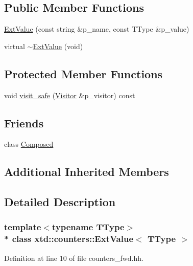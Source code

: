 \subsection*{Public Member Functions}
\begin{DoxyCompactItemize}
\item 
\hyperlink{classxtd_1_1counters_1_1ExtValue_ac56f634edb50ac47aca158e479bebeae}{Ext\+Value} (const string \&p\+\_\+name, const T\+Type \&p\+\_\+value)
\item 
virtual \hyperlink{classxtd_1_1counters_1_1ExtValue_a33aa51f76d3abae665265f3cea64a293}{$\sim$\+Ext\+Value} (void)
\end{DoxyCompactItemize}
\subsection*{Protected Member Functions}
\begin{DoxyCompactItemize}
\item 
void \hyperlink{classxtd_1_1counters_1_1ExtValue_af9ea755a42e20d03d325edfe27e05a75}{visit\+\_\+safe} (\hyperlink{classxtd_1_1counters_1_1Visitor}{Visitor} \&p\+\_\+visitor) const 
\end{DoxyCompactItemize}
\subsection*{Friends}
\begin{DoxyCompactItemize}
\item 
class \hyperlink{classxtd_1_1counters_1_1ExtValue_a93e934ad70d5b32b14beed5572450abf}{Composed}
\end{DoxyCompactItemize}
\subsection*{Additional Inherited Members}


\subsection{Detailed Description}
\subsubsection*{template$<$typename T\+Type$>$\\*
class xtd\+::counters\+::\+Ext\+Value$<$ T\+Type $>$}



Definition at line 10 of file counters\+\_\+fwd.\+hh.



